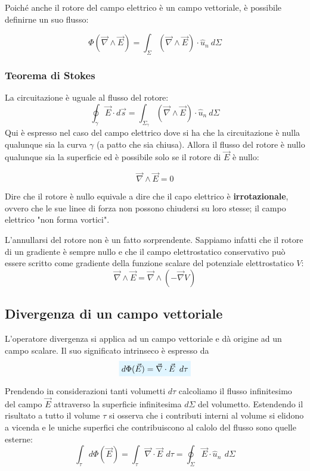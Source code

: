 \documentclass[x11names]{report}
\newcommand{\teorema}[2]{
	\begin{center}
		\fboxsep11pt
		\colorbox{myred}{\begin{minipage}{5.75in}
				\begin{redes}{#1}
					#2
				\end{redes}
		\end{minipage}}
	\end{center}
}
\newcommand{\viola}[1]{%
	\colorbox{myblue}{$\displaystyle #1$}
}
\begin{document}
Poiché anche il rotore del campo elettrico è un campo vettoriale, è possibile definirne un suo flusso:

\[
\Phi(\vec{\nabla} \wedge \vec{E}) =  \int_{\Sigma}\left(\vec{\nabla} \wedge \vec{E}\right)\cdot \hat{u}_n \: d\Sigma
\]

\teorema{}{
\subsubsection{Teorema di Stokes}
La circuitazione è uguale al flusso del rotore:
\[
\oint_\gamma \vec{E}\cdot d\vec{s} = \int_{\Sigma_\gamma}\left(\vec{\nabla} \wedge \vec{E}\right)\cdot \hat{u}_n \: d\Sigma
\]
Qui è espresso nel caso del campo elettrico dove si ha che la circuitazione è nulla qualunque sia la curva \(\gamma\) (a patto che sia chiusa). Allora il flusso del rotore è nullo qualunque sia la superficie ed è possibile solo se il rotore di \(\vec{E}\) è nullo:

\[
\vec{\nabla} \wedge \vec{E} = 0
\]

Dire che il rotore è nullo equivale a dire che il capo elettrico è \textbf{irrotazionale}, ovvero che le sue linee di forza non possono chiudersi su loro stesse; il campo elettrico "non forma vortici".
}

L'annullarsi del rotore non è un fatto sorprendente. Sappiamo infatti che il rotore di un gradiente è sempre nullo e che il campo elettrostatico conservativo può essere scritto come gradiente della funzione scalare del potenziale elettrostatico \(V\):
\[
\vec{\nabla} \wedge \vec{E} = \vec{\nabla} \wedge \left(-\vec{\nabla} V\right)
\]

\subsection{Divergenza di un campo vettoriale}
L'operatore divergenza si applica ad un campo vettoriale e dà origine ad un campo scalare. Il suo significato intrinseco è espresso da 
\begin{equation}
	\viola{d\Phi(\vec{E}) = \vec{\nabla}\cdot\vec{E}\,\ d\tau}
\end{equation}


Prendendo in considerazioni tanti volumetti \(d\tau\) calcoliamo il flusso infinitesimo del campo \(\vec{E}\) attraverso la superficie infinitesima \(d\Sigma\) del volumetto. Estendendo il risultato a tutto il volume \(\tau\) si osserva che i contributi interni al volume si elidono a vicenda e le uniche superfici che contribuiscono al calolo del flusso sono quelle esterne:
\[
\int_\tau d\Phi(\vec{E}) = \int_\tau  \vec{\nabla}\cdot\vec{E}\,\ d\tau = \oint_\Sigma \vec{E}\cdot\hat{u}_n \,\ d\Sigma
\]
\end{document}
